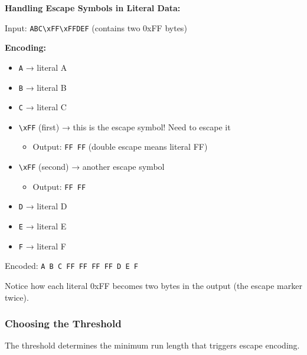 \begin{examplebox}
\textbf{Handling Escape Symbols in Literal Data:}

Input: \texttt{ABC\textbackslash xFF\textbackslash xFFDEF} (contains two 0xFF bytes)

\textbf{Encoding:}
\begin{itemize}
    \item \texttt{A} → literal A
    \item \texttt{B} → literal B
    \item \texttt{C} → literal C
    \item \verb|\xFF| (first) → this is the escape symbol! Need to escape it
    \begin{itemize}
        \item Output: \texttt{FF FF} (double escape means literal FF)
    \end{itemize}
    \item \verb|\xFF| (second) → another escape symbol
    \begin{itemize}
        \item Output: \texttt{FF FF}
    \end{itemize}
    \item \texttt{D} → literal D
    \item \texttt{E} → literal E
    \item \texttt{F} → literal F
\end{itemize}

Encoded: \texttt{A B C FF FF FF FF D E F}

Notice how each literal 0xFF becomes two bytes in the output (the escape marker twice).
\end{examplebox}

\subsubsection{Choosing the Threshold}

The threshold determines the minimum run length that triggers escape encoding.

